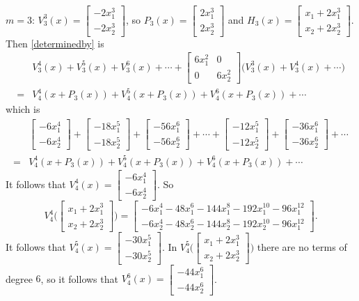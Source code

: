 \documentclass{article}
\begin{document}
$m=3$: $V_3^3(x)=\begin{bmatrix}-2x_1^3\\-2x_2^3\end{bmatrix}$, so
$P_3(x)=\begin{bmatrix}2x_1^3\\2x_2^3\end{bmatrix}$ and
$H_3(x)=\begin{bmatrix}x_1+2x_1^3\\x_2+2x_2^3\end{bmatrix}$.
Then \eqref{determinedby} is
\[
\begin{split}
&V_3^4(x)+V_3^5(x)+V_3^6(x)+\cdots+\begin{bmatrix}6x_1^2&0\\0&6x_2^2\end{bmatrix}\bigg( V_3^3(x)+V_3^4(x)+
\cdots\bigg)\\
=&V_4^4(x+P_3(x))+V_4^5(x+P_3(x))+V_4^6(x+P_3(x))+\cdots
\end{split}
\]
which is
\[
\begin{split}
&\begin{bmatrix}-6x_1^4\\-6x_2^4\end{bmatrix}+\begin{bmatrix}-18x_1^5\\-18x_2^5\end{bmatrix}
+\begin{bmatrix}-56x_1^6\\-56x_2^6\end{bmatrix}+\cdots
+\begin{bmatrix}-12x_1^5\\-12x_2^5\end{bmatrix}
+\begin{bmatrix}-36x_1^6\\-36x_2^6\end{bmatrix}+\cdots\\
=&V_4^4(x+P_3(x))+V_4^5(x+P_3(x))+V_4^6(x+P_3(x))+\cdots
\end{split}
\]
It follows that $V_4^4(x)=\begin{bmatrix}-6x_1^4\\-6x_2^4\end{bmatrix}$. 
So
\[
V_4^4\Big( \begin{bmatrix}x_1+2x_1^3\\x_2+2x_2^3\end{bmatrix}\Big)
=
\begin{bmatrix}
-6x_1^4-48x_1^6-144x_1^8-192x_1^{10}-96x_1^{12}\\
-6x_2^4-48x_2^6-144x_2^8-192x_2^{10}-96x_1^{12}
\end{bmatrix}.
\]
It follows that $V_4^5(x)=\begin{bmatrix}-30x_1^5\\-30x_2^5\end{bmatrix}$.
In $V_4^5\Big( \begin{bmatrix}x_1+2x_1^3\\x_2+2x_2^3\end{bmatrix}\Big)$ there are no terms
of degree $6$, so it follows that $V_4^6(x)=\begin{bmatrix}-44x_1^6\\-44x_2^6\end{bmatrix}$.
\end{document}
